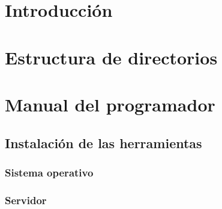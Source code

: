 
\section{Introducción}

\section{Estructura de directorios}

\section{Manual del programador}

\subsection{Instalación de las herramientas}

\subsubsection{Sistema operativo}

\subsubsection{Servidor}

